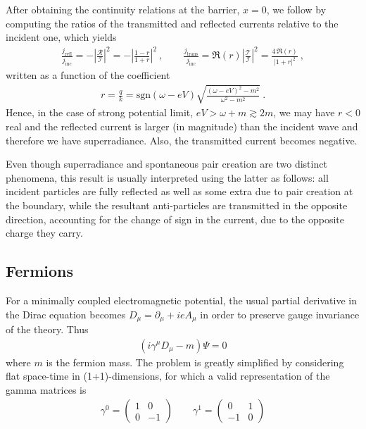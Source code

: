 After obtaining the continuity relations at the barrier, $x=0$, we follow by computing the ratios of the transmitted and reflected currents relative to the incident one, which yields
\begin{align}
    \frac{j_\mathrm{refl}}{j_\mathrm{inc}} = - \left|\frac{\mathcal{R}}{\mathcal{I}}\right|^2 = -\left|\frac{1-r}{1+r}\right|^2  ~, \qquad \frac{j_\mathrm{trans}}{j_\mathrm{inc}} = \Re(r) \left|\frac{\mathcal{T}}{\mathcal{I}}\right|^2 = \frac{4\, \Re(r)}{|1+r|^2} ~,
\end{align}
written as a function of the coefficient 
\begin{align}
    r = \frac{q}{k} = \mathrm{sgn}(\omega - e V)  \sqrt{\frac{(\omega - e V)^2 - m^2}{\omega^2 - m^2}} ~.
\end{align}
Hence, in the case of strong potential limit, $e V > \omega + m \gtrsim 2 m$, we may have $r<0$ real and the reflected current is larger (in magnitude) than the incident wave and therefore we have superradiance. Also, the transmitted current becomes negative. 

Even though superradiance and spontaneous pair creation are two distinct phenomena, this result is usually interpreted using the latter as follows: all incident particles are fully reflected as well as some extra due to pair creation at the boundary, while the resultant anti-particles are transmitted in the opposite direction, accounting for the change of sign in the current, due to the opposite charge they carry.

\subsection{Fermions}

For a minimally coupled electromagnetic potential, the usual partial derivative in the Dirac equation becomes $D_\mu = \partial_\mu + i e A_\mu$ in order to preserve gauge invariance of the theory. Thus
\begin{align}
    ( i \gamma^\mu D_\mu - m ) \Psi = 0
    \label{eq:dirac}
\end{align}
where $m$ is the fermion mass.
The problem is greatly simplified by considering flat space-time in (1+1)-dimensions, for which a valid representation of the gamma matrices is
\begin{align}
    \gamma^0 = \left(\begin{array}{cr} 1 & 0 \\  0 & -1 \end{array}\right) \qquad 
    \gamma^1 = \left(\begin{array}{cr} 0 & 1 \\ -1 & 0 \end{array}\right)
    \label{eq:gamma1+1}
\end{align}

